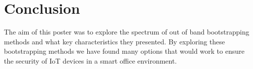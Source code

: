 \section{Conclusion}

The aim of this poster was to explore the spectrum of out of band bootstrapping methods and what key characteristics they presented. By exploring these bootstrapping methods we have found many options that would work to ensure the security of IoT devices in a smart office environment. 
